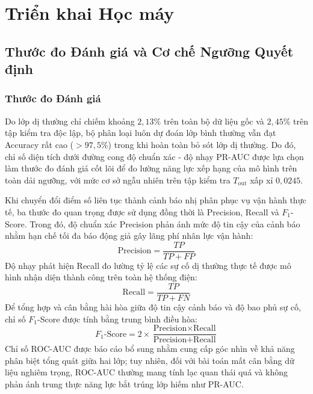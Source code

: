 \section{Triển khai Học máy}

\subsection{Thước đo Đánh giá và Cơ chế Ngưỡng Quyết định}

\subsubsection{Thước đo Đánh giá}
Do lớp dị thường chỉ chiếm khoảng $2{,}13\%$ trên toàn bộ dữ liệu gốc và $2{,}45\%$ trên tập kiểm tra độc lập, bộ phân loại luôn dự đoán lớp bình thường vẫn đạt Accuracy rất cao ($> 97{,}5\%$) trong khi hoàn toàn bỏ sót lớp dị thường. Do đó, chỉ số diện tích dưới đường cong độ chuẩn xác - độ nhạy PR-AUC được lựa chọn làm thước đo đánh giá cốt lõi để đo lường năng lực xếp hạng của mô hình trên toàn dải ngưỡng, với mức cơ sở ngẫu nhiên trên tập kiểm tra $T_{\text{out}}$ xấp xỉ $0{,}0245$. 

Khi chuyển đổi điểm số liên tục thành cảnh báo nhị phân phục vụ vận hành thực tế, ba thước đo quan trọng được sử dụng đồng thời là Precision, Recall và $F_1$-Score. Trong đó, độ chuẩn xác Precision phản ánh mức độ tin cậy của cảnh báo nhằm hạn chế tối đa báo động giả gây lãng phí nhân lực vận hành:
\begin{equation*}
    \text{Precision} = \frac{TP}{TP + FP}
\end{equation*}
Độ nhạy phát hiện Recall đo lường tỷ lệ các sự cố dị thường thực tế được mô hình nhận diện thành công trên toàn hệ thống điện:
\begin{equation*}
    \text{Recall} = \frac{TP}{TP + FN}
\end{equation*}
Để tổng hợp và cân bằng hài hòa giữa độ tin cậy cảnh báo và độ bao phủ sự cố, chỉ số $F_1$-Score được tính bằng trung bình điều hòa:
\begin{equation*}
    F_1\text{-Score} = 2 \times \frac{\text{Precision} \times \text{Recall}}{\text{Precision} + \text{Recall}}
\end{equation*}
Chỉ số ROC-AUC được báo cáo bổ sung nhằm cung cấp góc nhìn về khả năng phân biệt tổng quát giữa hai lớp; tuy nhiên, đối với bài toán mất cân bằng dữ liệu nghiêm trọng, ROC-AUC thường mang tính lạc quan thái quá và không phản ánh trung thực năng lực bắt trúng lớp hiếm như PR-AUC.


